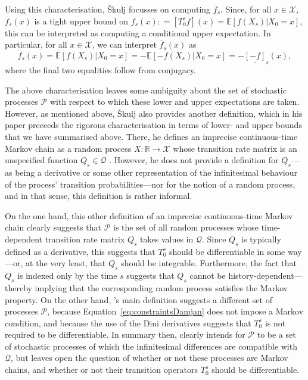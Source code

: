\documentclass[10pt,a4paper]{paper}
\theoremstyle{definition}
\newcommand{\reals}{\mathbb{R}}
\newcommand{\states}{\mathcal{X}}
\newcommand{\rateset}{\mathcal{Q}}
\newcommand{\coloneqq}{:\!=}
\begin{document}
Using this characterisation, {\v{S}kulj} focusses on computing $\overline{f}_s$. Since, for all $x\in\states$, $\overline{f}_s(x)$ is a tight upper bound on $f_s(x)\coloneqq [T_0^sf](x)=\mathbb{E}[f(X_s)\vert X_0=x]$, this can be interpreted as computing a conditional upper expectation. In particular, for all $x\in\states$, we can interpret $\overline{f}_s(x)$ as
\begin{equation*}
\overline{f}_s(x)
=
\overline{\mathbb{E}}[f(X_s)\vert X_0=x]=-\underline{\mathbb{E}}[-f(X_s)\vert X_0=x]
=-\underline{[-f]}_s(x),
\end{equation*}
where the final two equalities follow from conjugacy. 


The above characterisation leaves some ambiguity about the set of stochastic processes $\mathcal{P}$ with respect to which these lower and upper expectations are taken. 
However, as mentioned above, {\v{S}kulj} also provides another definition, which in his paper preceeds the rigorous characterisation in terms of lower- and upper bounds that we have summarised above. There, he defines an imprecise continuous-time Markov chain as a random process $X\colon\reals\to\states$ whose transition rate matrix is an unspecified function $Q_s\in\rateset$ \cite[Definition~1]{Skulj:2015cq}. However, he does not provide a definition for $Q_s$---as being a derivative or some other representation of the infinitesimal behaviour of the process' transition probabilities---nor for the notion of a random process, and in that sense, this definition is rather informal. 


On the one hand, this other definition of an imprecise continuous-time Markov chain clearly suggests that $\mathcal{P}$ is the set of all random processes whose time-dependent transition rate matrix $Q_s$ takes values in $\rateset$. Since $Q_s$ is typically defined as a derivative, this suggests that $T_0^s$ should be differentiable in some way---or, at the very least, that $Q_s$ should be integrable. Furthermore, the fact that $Q_s$ is indexed only by the time $s$ suggests that $Q_s$ cannot be history-dependent---thereby implying that the corresponding random process satisfies the Markov property. On the other hand, {}'s main definition suggests a different set of processes $\mathcal{P}$, because Equation~\eqref{eq:constraintsDamjan} does not impose a Markov condition, and because the use of the Dini derivatives suggests that $T_0^s$ is not required to be differentiable. In summary then, {} clearly intends for $\mathcal{P}$ to be a set of stochastic processes of which the infinitesimal differences are compatible with $\rateset$, but leaves open the question of whether or not these processes are Markov chains, and whether or not their transition operators $T_0^s$ should be differentiable.
\end{document}
